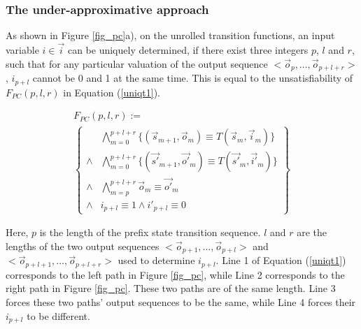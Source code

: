 \documentclass[twocolumn]{article}
\begin{document}
\subsubsection{The under-approximative approach}\label{subsub_sound}

As shown in Figure \ref{fig_pc}a),
on the unrolled transition functions,
an input variable $i\in\vec{i}$ can be uniquely determined,
if there exist three integers $p$, $l$ and $r$,
such that for any particular valuation of the output sequence $<\vec{o}_p,\dots,\vec{o}_{p+l+r}>$,
$i_{p+l}$ cannot be 0 and 1 at the same time.
This is equal to the unsatisfiability of $F_{PC}(p,l,r)$ in Equation (\ref{uniqt1}).

\begin{multline}\label{uniqt1}
F_{PC}(p,l,r):=\\
\left\{
\begin{array}{cc}
&\bigwedge_{m=0}^{p+l+r}
\{
(\vec{s}_{m+1},\vec{o}_m)\equiv T(\vec{s}_m,\vec{i}_m)
\}
\\
\wedge&\bigwedge_{m=0}^{p+l+r}
\{
(\vec{s'}_{m+1},\vec{o'}_m)\equiv T(\vec{s'}_m,\vec{i'}_m)
\}
\\
\wedge&\bigwedge_{m=p}^{p+l+r}\vec{o}_m\equiv \vec{o'}_m \\
\wedge& i_{p+l}\equiv 1 \wedge  i'_{p+l}\equiv 0 
\end{array}
\right\}
\end{multline}



Here,
$p$ is the length of the prefix state transition sequence.
$l$ and $r$ are the lengths of the two output sequences 
$<\vec{o}_{p+1},\dots,\vec{o}_{p+l}>$ and $<\vec{o}_{p+l+1},\dots,\vec{o}_{p+l+r}>$
used to determine $i_{p+l}$.
Line 1 of Equation (\ref{uniqt1}) corresponds to the left path in Figure \ref{fig_pc},
while Line 2 corresponds to the right path in Figure \ref{fig_pc}.
These two paths are of the same length.
Line 3 forces these two paths' output sequences to be the same,
while Line 4 forces their $i_{p+l}$ to be different.
\end{document}
